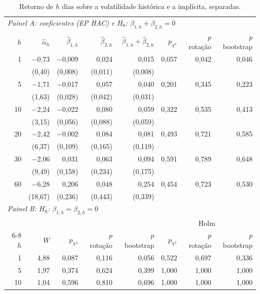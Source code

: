 \begin{table}[H]
\centering
\footnotesize
\caption{Retorno de $h$ dias sobre a volatilidade histórica e a implícita, separadas.}
\label{tab:retlin-componentes-wald}
\begin{tabular}{rrrrrrrr}
\toprule
\multicolumn{8}{l}{\textit{Painel A: coeficientes (EP HAC) e $H_0$: $\beta_{1,h} + \beta_{2,h} = 0$}} \\
$h$ & $\hat\alpha_h$ & $\hat\beta_{1,h}$ & $\hat\beta_{2,h}$ & $\hat\beta_{1,h} + \hat\beta_{2,h}$ & $p_{\chi^2}$ & $p$ rotação & $p$ bootstrap \\
\midrule
1 & $-$0{,}73 & $-$0{,}009 & 0{,}024 & 0{,}015 & 0{,}057 & 0{,}042 & 0{,}046 \\
 & (0{,}40) & (0{,}008) & (0{,}011) & (0{,}008) & & & \\
5 & $-$1{,}71 & $-$0{,}017 & 0{,}057 & 0{,}040 & 0{,}201 & 0{,}345 & 0{,}223 \\
 & (1{,}63) & (0{,}028) & (0{,}042) & (0{,}031) & & & \\
10 & $-$2{,}24 & $-$0{,}022 & 0{,}080 & 0{,}059 & 0{,}322 & 0{,}535 & 0{,}413 \\
 & (3{,}15) & (0{,}056) & (0{,}088) & (0{,}059) & & & \\
20 & $-$2{,}42 & $-$0{,}002 & 0{,}084 & 0{,}081 & 0{,}493 & 0{,}721 & 0{,}585 \\
 & (6{,}37) & (0{,}109) & (0{,}165) & (0{,}119) & & & \\
30 & $-$2{,}06 & 0{,}031 & 0{,}063 & 0{,}094 & 0{,}591 & 0{,}789 & 0{,}648 \\
 & (9{,}49) & (0{,}158) & (0{,}234) & (0{,}175) & & & \\
60 & $-$6{,}28 & 0{,}206 & 0{,}048 & 0{,}254 & 0{,}454 & 0{,}723 & 0{,}530 \\
 & (18{,}67) & (0{,}236) & (0{,}443) & (0{,}339) & & & \\
\midrule
\multicolumn{8}{l}{\textit{Painel B: $H_0$: $\beta_{1,h} = \beta_{2,h} = 0$}} \\
 & & & & & \multicolumn{3}{c}{Holm} \\ \cmidrule(lr){6-8}
$h$ & $W$ & $p_{\chi^2}$ & $p$ rotação & $p$ bootstrap & $p_{\chi^2}$ & $p$ rotação & $p$ bootstrap \\
1 & 4{,}88 & 0{,}087 & 0{,}116 & 0{,}056 & 0{,}522 & 0{,}697 & 0{,}336 \\
5 & 1{,}97 & 0{,}374 & 0{,}624 & 0{,}399 & 1{,}000 & 1{,}000 & 1{,}000 \\
10 & 1{,}04 & 0{,}596 & 0{,}810 & 0{,}696 & 1{,}000 & 1{,}000 & 1{,}000 \\

\end{tabular}
\end{table}
